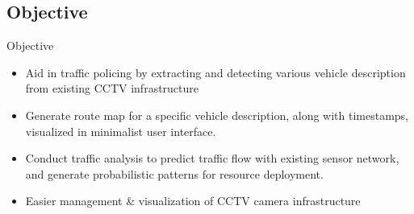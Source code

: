 \documentclass{beamer}
\begin{document}
	\subsection{Objective}
	\begin{frame}{Objective}
		\begin{itemize}
			\item Aid in traffic policing by extracting and detecting various vehicle
			description from existing CCTV infrastructure
			\item Generate route map for a specific vehicle description, along with timestamps, visualized in minimalist user interface. 
			\item Conduct traffic analysis to predict traffic flow with existing sensor
			network, and generate probabilistic patterns for resource deployment.
			\item Easier management \& visualization of CCTV camera infrastructure
		\end{itemize}
	\end{frame}
\end{document}
